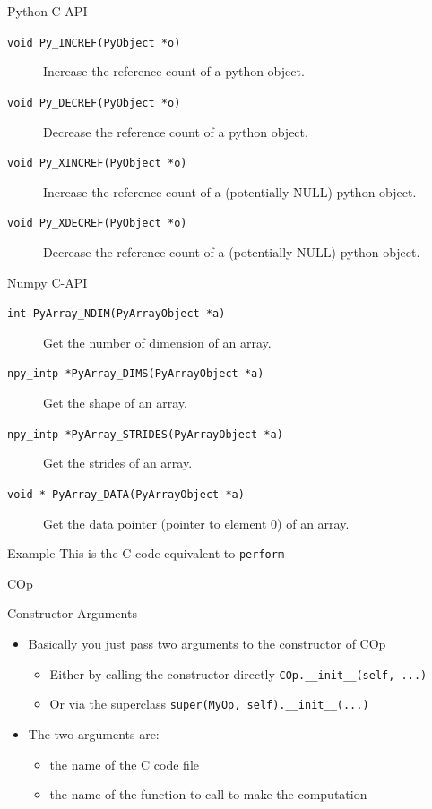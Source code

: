 \documentclass[utf8x]{beamer}
\newcommand{\code}[1]{\lstinline[emph={[2]}]|#1|}
\begin{document}
\begin{frame}{Python C-API}
\begin{description}
\item[\texttt{void Py\_INCREF(PyObject *o)}] Increase the reference count of a python object.
\item[\texttt{void Py\_DECREF(PyObject *o)}] Decrease the reference count of a python object.
\item[\texttt{void Py\_XINCREF(PyObject *o)}] Increase the reference count of a (potentially NULL) python object.
\item[\texttt{void Py\_XDECREF(PyObject *o)}] Decrease the reference count of a (potentially NULL) python object.
\end{description}
\end{frame}

\begin{frame}{Numpy C-API}
\begin{description}
\item[\texttt{int PyArray\_NDIM(PyArrayObject *a)}] Get the number of dimension of an array.
\item[\texttt{npy\_intp *PyArray\_DIMS(PyArrayObject *a)}] Get the shape of an array.
\item[\texttt{npy\_intp *PyArray\_STRIDES(PyArrayObject *a)}] Get the strides of an array.
\item[\texttt{void * PyArray\_DATA(PyArrayObject *a)}] Get the data pointer (pointer to element 0) of an array.
\end{description}
\end{frame}

\begin{frame}[allowframebreaks]{Example}
\vskip5mm
This is the C code equivalent to \code{perform}
\vskip4mm

\end{frame}

\begin{frame}{COp}

\end{frame}

\begin{frame}{Constructor Arguments}
\begin{itemize}
\item Basically you just pass two arguments to the constructor of COp
\begin{itemize}
\item Either by calling the constructor directly \code{COp.__init__(self, ...)}
\item Or via the superclass \code{super(MyOp, self).__init__(...)}
\end{itemize}
\item The two arguments are:
\begin{itemize}
\item the name of the C code file
\item the name of the function to call to make the computation
\end{itemize}
\end{itemize}
\end{frame}
\end{document}
